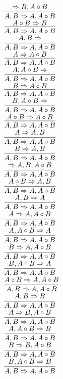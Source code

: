 \documentclass[11pt]{article}
\begin{document}
\begin{center}
\bigskip
\\$\infer{A, B\Rightarrow A, A\circ B}{\Rightarrow B, A\circ B}$
\bigskip
\\$\infer{A, B\Rightarrow A, A\circ B}{A\circ B\Rightarrow B}$
\bigskip
\\$\infer{A, B\Rightarrow A, A\circ B}{A, B\Rightarrow }$
\bigskip
\\$\infer{A, B\Rightarrow A, A\circ B}{A\Rightarrow A\circ B}$
\bigskip
\\$\infer{A, B\Rightarrow A, A\circ B}{A, A\circ B\Rightarrow }$
\bigskip
\\$\infer{A, B\Rightarrow A, A\circ B}{B\Rightarrow A\circ B}$
\bigskip
\\$\infer{A, B\Rightarrow A, A\circ B}{B, A\circ B\Rightarrow }$
\bigskip
\\$\infer{A, B\Rightarrow A, A\circ B}{A\circ B\Rightarrow A\circ B}$
\bigskip
\\$\infer{A, B\Rightarrow A, A\circ B}{A\Rightarrow A, B}$
\bigskip
\\$\infer{A, B\Rightarrow A, A\circ B}{B\Rightarrow A, B}$
\bigskip
\\$\infer{A, B\Rightarrow A, A\circ B}{\Rightarrow A, B, A\circ B}$
\bigskip
\\$\infer{A, B\Rightarrow A, A\circ B}{A\circ B\Rightarrow A, B}$
\bigskip
\\$\infer{A, B\Rightarrow A, A\circ B}{A, B\Rightarrow A}$
\bigskip
\\$\infer{A, B\Rightarrow A, A\circ B}{A\Rightarrow A, A\circ B}$
\bigskip
\\$\infer{A, B\Rightarrow A, A\circ B}{A, A\circ B\Rightarrow A}$
\bigskip
\\$\infer{A, B\Rightarrow A, A\circ B}{B\Rightarrow A, A\circ B}$
\bigskip
\\$\infer{A, B\Rightarrow A, A\circ B}{B, A\circ B\Rightarrow A}$
\bigskip
\\$\infer{A, B\Rightarrow A, A\circ B}{A\circ B\Rightarrow A, A\circ B}$
\bigskip
\\$\infer{A, B\Rightarrow A, A\circ B}{A, B\Rightarrow B}$
\bigskip
\\$\infer{A, B\Rightarrow A, A\circ B}{A\Rightarrow B, A\circ B}$
\bigskip
\\$\infer{A, B\Rightarrow A, A\circ B}{A, A\circ B\Rightarrow B}$
\bigskip
\\$\infer{A, B\Rightarrow A, A\circ B}{B\Rightarrow B, A\circ B}$
\bigskip
\\$\infer{A, B\Rightarrow A, A\circ B}{B, A\circ B\Rightarrow B}$

\end{center}
\end{document}
